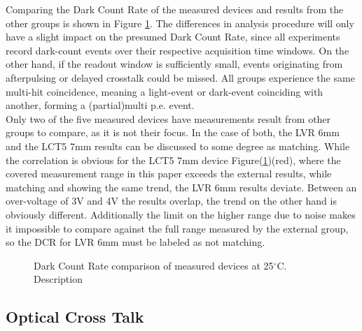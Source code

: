 \documentclass[12pt,article,type=msc,colorback,accentcolor=tud9c]{tudthesis}
\begin{document}
Comparing the Dark Count Rate of the measured devices and results from the other groups is shown in Figure \ref{fig:DC_DCR}. The differences in analysis procedure will only have a slight impact on the presumed Dark Count Rate, since all experiments record dark-count events over their respective acquisition time windows. On the other hand, if the readout window is sufficiently small, events originating from afterpulsing or delayed crosstalk could be missed. All groups experience the same multi-hit coincidence, meaning a light-event or dark-event coinciding with another, forming a (partial)multi p.e. event.\\
Only two of the five measured devices have measurements result from other groups to compare, as it is not their focus. In the case of both, the LVR 6mm and the LCT5 7mm results can be discussed to some degree as matching. While the correlation is obvious for the LCT5 7mm device Figure(\ref{fig:DC_DCR})(red), where the covered measurement range in this paper exceeds the  external results, while matching and showing the same trend, the LVR 6mm results deviate. Between an over-voltage of 3V and 4V the results overlap, the trend on the other hand is obviously different. Additionally the limit on the higher range due to noise makes it impossible to compare against the full range measured by the external group, so the DCR for LVR 6mm must be labeled as not matching. 

\begin{figure}%
\begin{centering}
\caption[DCR device comparison]{Dark Count Rate comparison of measured devices at 25$^\circ$C. Description}
\label{fig:DC_DCR}
\end{centering}
\end{figure}

\subsection{Optical Cross Talk}
\label{subsec:DC_OCT}
\end{document}
